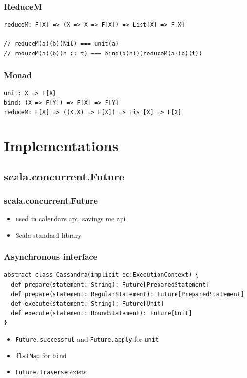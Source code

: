 \documentclass{beamer}
\begin{document}
\begin{frame}[fragile]
\frametitle{ReduceM}
\begin{lstlisting}
reduceM: F[X] => (X => X => F[X]) => List[X] => F[X]

// reduceM(a)(b)(Nil) === unit(a)
// reduceM(a)(b)(h :: t) === bind(b(h))(reduceM(a)(b)(t))
\end{lstlisting}
\end{frame}

\begin{frame}[fragile]
\frametitle{Monad}
\begin{lstlisting}
unit: X => F[X]
bind: (X => F[Y]) => F[X] => F[Y]
reduceM: F[X] => ((X,X) => F[X]) => List[X] => F[X]
\end{lstlisting}
\end{frame}


\section{Implementations}

\subsection{scala.concurrent.Future}
\begin{frame}
\frametitle{scala.concurrent.Future}
\begin{itemize}
\item used in calendars api, savings me api
\item Scala standard library
\end{itemize}
\end{frame}

\begin{frame}[fragile]
\frametitle{Asynchronous interface}
\begin{lstlisting}
abstract class Cassandra(implicit ec:ExecutionContext) {
  def prepare(statement: String): Future[PreparedStatement]
  def prepare(statement: RegularStatement): Future[PreparedStatement]
  def execute(statement: String): Future[Unit]
  def execute(statement: BoundStatement): Future[Unit]
}
\end{lstlisting}
\begin{itemize}
\item \verb|Future.successful| and \verb|Future.apply| for \verb|unit|
\item \verb|flatMap| for \verb|bind|
\item \verb|Future.traverse| exists
\end{itemize}
\end{frame}
\end{document}
